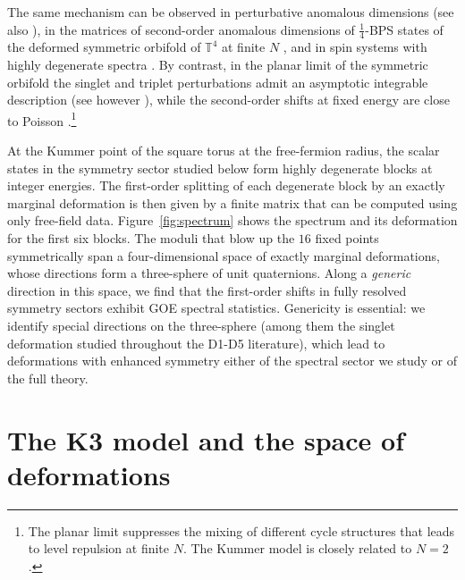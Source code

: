 \documentclass[aps,twocolumn,preprintnumbers,groupedaddress,nofootinbib,prl]{revtex4-2}
\newcommand{\Tf}{\mathbb T^4}
\begin{document}
The same mechanism can be observed in perturbative anomalous dimensions \cite{McLoughlin:2020zew,McLoughlin:2022jyt,Baume:2026jyt} (see also \cite{Caputa:2026hvh}), in the matrices of second-order anomalous dimensions of $\frac14$-BPS states of the deformed symmetric orbifold of $\Tf$ at finite $N$ \cite{Zhang:2026jnf,Gaberdiel:2026jor}, and in spin systems with highly degenerate spectra \cite{Abdelshafy:2025ddx}. By contrast, in the planar limit of the symmetric orbifold the singlet and triplet perturbations admit an asymptotic integrable description \cite{Gaberdiel:2023lco,Frolov:2023pjw,Gaberdiel:2025smz} (see however \cite{Fabri:2025rok}), while the second-order shifts at fixed energy are close to Poisson \cite{Zhang:2026jnf}.\footnote{The planar limit suppresses the mixing of different cycle structures that leads to level repulsion at finite $N$. The Kummer model is closely related to $N=2$.}

At the Kummer point of the square torus at the free-fermion radius, the scalar states in the symmetry sector studied below form highly degenerate blocks at integer energies. The first-order splitting of each degenerate block by an exactly marginal deformation is then given by a finite matrix that can be computed using only free-field data. Figure~\ref{fig:spectrum} shows the spectrum and its deformation for the first six blocks. The moduli that blow up the $16$ fixed points symmetrically span a four-dimensional space of exactly marginal deformations, whose directions form a three-sphere of unit quaternions. Along a {\it generic} direction in this space, we find that the first-order shifts in fully resolved symmetry sectors exhibit GOE spectral statistics. Genericity is essential: we identify special directions on the three-sphere (among them the singlet deformation studied throughout the D1-D5 literature), which lead to deformations with enhanced symmetry either of the spectral sector we study or of the full theory.


\section{The K3 model and the space of deformations}
\label{sec:theory}
\end{document}
